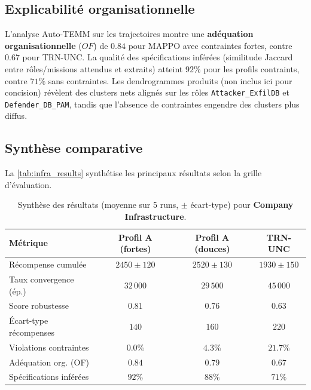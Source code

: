 \subsection*{Explicabilité organisationnelle}

L’analyse Auto-TEMM sur les trajectoires montre une \textbf{adéquation organisationnelle} ($OF$) de $0.84$ pour MAPPO avec contraintes fortes, contre $0.67$ pour TRN-UNC.
La qualité des spécifications inférées (similitude Jaccard entre rôles/missions attendus et extraits) atteint $92\%$ pour les profils contraints, contre $71\%$ sans contraintes.
Les dendrogrammes produits (non inclus ici pour concision) révèlent des clusters nets alignés sur les rôles \texttt{Attacker\_ExfilDB} et \texttt{Defender\_DB\_PAM}, tandis que l’absence de contraintes engendre des clusters plus diffus.

\subsection*{Synthèse comparative}

La \autoref{tab:infra_results} synthétise les principaux résultats selon la grille d’évaluation.

\begin{table}[h!]
  \centering
  \caption{Synthèse des résultats (moyenne sur 5 runs, $\pm$ écart-type) pour \textbf{Company Infrastructure}.}
  \label{tab:infra_results}
  \renewcommand{\arraystretch}{1.2}
  \small
  \begin{tabular}{|l|c|c|c|}
    \hline
    \textbf{Métrique}       & \textbf{Profil A (fortes)} & \textbf{Profil A (douces)} & \textbf{TRN-UNC} \\
    \hline
    Récompense cumulée      & $2450 \pm 120$             & $2520 \pm 130$             & $1930 \pm 150$   \\
    \hline
    Taux convergence (ép.)  & $32\,000$                  & $29\,500$                  & $45\,000$        \\
    \hline
    Score robustesse        & $0.81$                     & $0.76$                     & $0.63$           \\
    \hline
    Écart-type récompenses  & $140$                      & $160$                      & $220$            \\
    \hline
    Violations contraintes  & $0.0\%$                    & $4.3\%$                    & $21.7\%$         \\
    \hline
    Adéquation org. (OF)    & $0.84$                     & $0.79$                     & $0.67$           \\
    \hline
    Spécifications inférées & $92\%$                     & $88\%$                     & $71\%$           \\
    \hline
  \end{tabular}
\end{table}

